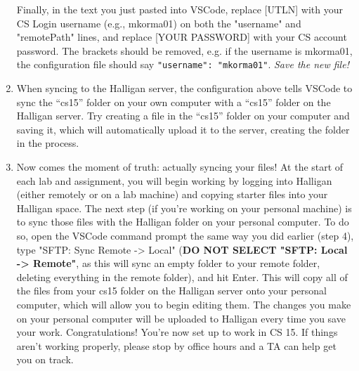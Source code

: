 \documentclass[12pt]{article}
\begin{document}
\begin{enumerate}
Finally, in the text you just pasted into VSCode, replace [UTLN] with your CS Login username (e.g., mkorma01) on both the "username" and "remotePath" lines, and replace [YOUR PASSWORD] with your CS account password. The brackets should be removed, e.g. if the username is mkorma01, the configuration file should say \texttt{"username": "mkorma01"}. \textit{Save the new file!}

\item
When syncing to the Halligan server, the configuration above tells VSCode to sync the “cs15” folder on your own computer with a “cs15” folder on the Halligan server. Try creating a file in the ``cs15'' folder on your computer and saving it, which will automatically upload it to the server, creating the folder in the process.

\item
Now comes the moment of truth: actually syncing your files! At the start of each lab and assignment, you will begin working by logging into Halligan (either remotely or on a lab machine) and copying starter files into your Halligan space. The next step (if you're working on your personal machine) is to sync those files with the Halligan folder on your personal computer. To do so, open the VSCode command prompt the same way you did earlier (step 4), type "SFTP: Sync Remote -> Local" (\textbf{DO NOT SELECT "SFTP: Local -> Remote"}, as this will sync an empty folder to your remote folder, deleting everything in the remote folder), and hit Enter. This will copy all of the files from your cs15 folder on the Halligan server onto your personal computer, which will allow you to begin editing them. The changes you make on your personal computer will be uploaded to Halligan every time you save your work. Congratulations! You’re now set up to work in CS 15. If things aren’t working properly, please stop by office hours and a TA can help get you on track.

\end{enumerate}
\end{document}
